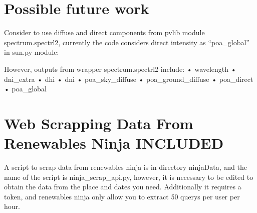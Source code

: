 \documentclass{report}
\begin{document}
\section{Possible future work}
Consider to use diffuse and direct components from pvlib module spectrum.spectrl2, currently the code considers direct intensity as “poa_global” in sun.py module:















However,  outputs from wrapper  spectrum.spectrl2 include:
    • wavelength
    • dni_extra
    • dhi
    • dni
    • poa_sky_diffuse
    • poa_ground_diffuse
    • poa_direct
    • poa_global



\section{Web Scrapping Data From Renewables Ninja INCLUDED}

A script to scrap data from renewables ninja is in directory ninjaData, and the name of the script is ninja_scrap_api.py, however, it is necessary to be edited to obtain the data from the place and dates you need. Additionally it requires a token, and  renewables ninja only allow you to extract 50 querys per user per hour. 
\end{document}
